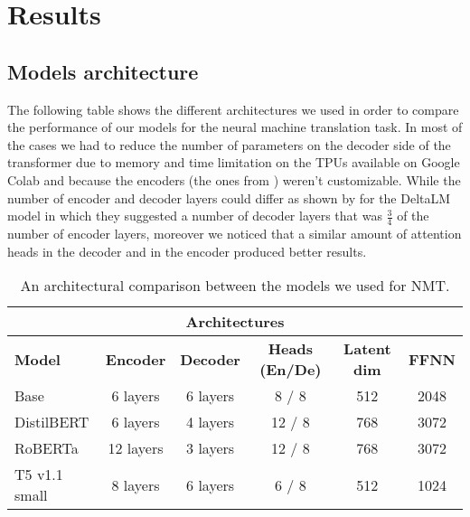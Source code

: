 \section{Results} \label{sec:results}
\subsection{Models architecture}
The following table shows the different architectures we used in order to compare the performance of our models for the neural machine translation task. In most of the cases we had to reduce the number of parameters on the decoder side of the transformer due to memory and time limitation on the TPUs available on Google Colab and because the encoders (the ones from \cite{huggingface_co}) weren't customizable. While the number of encoder and decoder layers could differ as shown by \cite{ma2021deltalm} for the DeltaLM model in which they suggested a number of decoder layers that was $\frac{3}{4}$ of the number of encoder layers, moreover we noticed that a similar amount of attention heads in the decoder and in the encoder produced better results.

\begin{table}[H]
\centering
\begin{tabular}{l|c|c|c|c|c}\hline \hline
\multicolumn{6}{c}{\textbf{Architectures}} \\\hline
\textbf{Model} & \textbf{Encoder} & \textbf{Decoder} & \textbf{Heads (En/De)} & \textbf{Latent dim} & \textbf{FFNN}\\\hline
Base & 6 layers & 6 layers & 8 / 8 & 512  & 2048 \\
DistilBERT & 6 layers & 4 layers & 12 / 8 & 768 & 3072 \\
RoBERTa & 12 layers & 3 layers & 12 / 8 & 768 & 3072\\
T5 v1.1 small & 8 layers & 6 layers & 6 / 8 & 512 & 1024\\\hline \hline
\end{tabular}
\caption{An architectural comparison between the models we used for NMT.}
\label{table:architectures}
\end{table}

